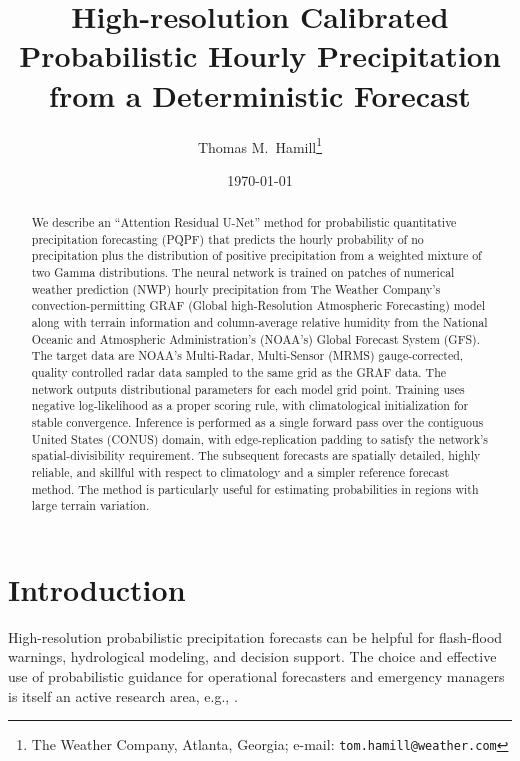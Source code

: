 \documentclass[11pt]{article}
\title{High-resolution Calibrated Probabilistic Hourly Precipitation from a Deterministic Forecast}
\author{Thomas M.\ Hamill\thanks{The Weather Company, Atlanta,
  Georgia; e-mail: \texttt{tom.hamill@weather.com}}}
\date{\today}
\begin{document}
\maketitle

\begin{abstract}
We describe an ``Attention Residual U-Net'' method for probabilistic quantitative
precipitation forecasting (PQPF) that predicts the hourly probability of no precipitation plus
the distribution of positive precipitation from a weighted mixture of two Gamma distributions.
The neural network is trained on patches of numerical weather prediction
(NWP) hourly precipitation from The Weather Company's convection-permitting GRAF (Global
high-Resolution Atmospheric Forecasting) model along with terrain information and
column-average relative humidity from the National Oceanic and
Atmospheric Administration's (NOAA's) Global Forecast System (GFS).
The target data are NOAA's Multi-Radar, Multi-Sensor (MRMS)
gauge-corrected, quality controlled radar data sampled to the same grid as the GRAF data.
The network outputs distributional parameters for each model grid point.
Training uses negative log-likelihood as a proper scoring rule,
with climatological initialization for stable convergence.
Inference is performed as a single forward pass over the contiguous United States (CONUS)
domain, with edge-replication padding to satisfy the network's spatial-divisibility
requirement.  The subsequent
forecasts are spatially detailed, highly reliable, and skillful with respect to climatology and a simpler
reference forecast method.  The method is particularly useful for estimating probabilities 
in regions with large terrain variation.
\end{abstract}

\section{Introduction}
\label{sec:intro}

High-resolution probabilistic precipitation forecasts can be helpful
for flash-flood warnings, hydrological modeling, and decision
support.  The choice and effective use of probabilistic
guidance for operational forecasters and emergency managers is
itself an active research area, e.g.,
\citep{murphy1993, gneiting2007, hoss2016, raftery2016, cross2021,
ripberger2022, heggli2023, radford2023}.
\end{document}
